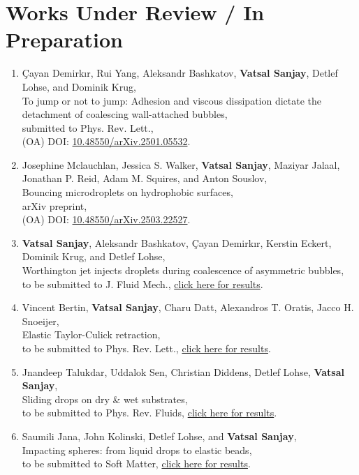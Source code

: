 \documentclass[10pt,a4paper,colorlinks,linkcolor=blue,urlcolor=blue,citecolor=blue]{moderncv}
\begin{document}
\section{Works Under Review / In Preparation}
\begin{enumerate}[leftmargin=1.25em]
	\item Çayan Demirkır, Rui Yang, Aleksandr Bashkatov, \textbf{Vatsal Sanjay}, Detlef Lohse, and Dominik Krug,\\
	To jump or not to jump: Adhesion and viscous dissipation dictate the detachment of coalescing wall-attached bubbles,\\
	submitted to Phys. Rev. Lett.,\\
	(OA) DOI: \href{https://doi.org/10.48550/arXiv.2501.05532}{10.48550/arXiv.2501.05532}.

	\item Josephine Mclauchlan, Jessica S. Walker, \textbf{Vatsal Sanjay}, Maziyar Jalaal, Jonathan P. Reid, Adam M. Squires, and Anton Souslov,\\
	Bouncing microdroplets on hydrophobic surfaces,\\
	arXiv preprint,\\
	(OA) DOI: \href{https://doi.org/10.48550/arXiv.2503.22527}{10.48550/arXiv.2503.22527}.

	\item \textbf{Vatsal Sanjay}, Aleksandr Bashkatov, Çayan Demirkır, Kerstin Eckert, Dominik Krug, and Detlef Lohse,\\
	Worthington jet injects droplets during coalescence of asymmetric bubbles,\\
	to be submitted to J. Fluid Mech., \href{https://youtu.be/WZonMHzzkXQ}{click here for results}.

	\item Vincent Bertin, \textbf{Vatsal Sanjay}, Charu Datt, Alexandros T. Oratis, Jacco H. Snoeijer,\\
	Elastic Taylor-Culick retraction,\\
	to be submitted to Phys. Rev. Lett., \href{https://tinyurl.com/2cvo89bd}{click here for results}.

	\item Jnandeep Talukdar, Uddalok Sen, Christian Diddens, Detlef Lohse, \textbf{Vatsal Sanjay},\\
	Sliding drops on dry \& wet substrates,\\
	to be submitted to Phys. Rev. Fluids, \href{https://tinyurl.com/2xvlhlc6}{click here for results}.

	\item Saumili Jana, John Kolinski, Detlef Lohse, and \textbf{Vatsal Sanjay},\\
	Impacting spheres: from liquid drops to elastic beads,\\
	to be submitted to Soft Matter, \href{https://tinyurl.com/28s25jvf}{click here for results}.

\end{enumerate}
\end{document}
